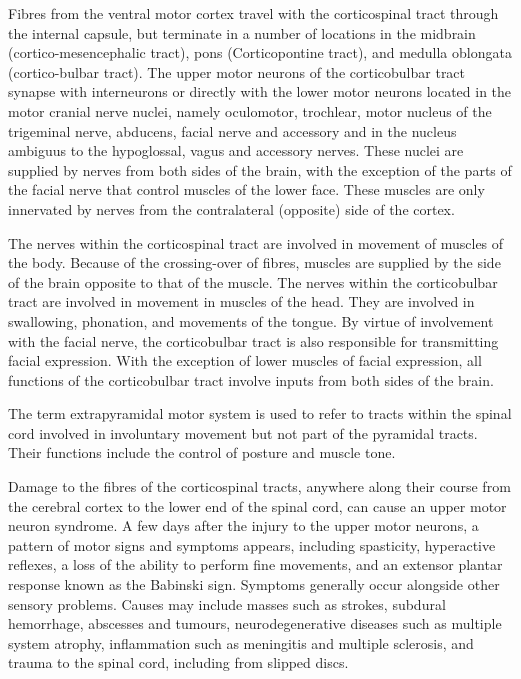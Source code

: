Fibres from the ventral motor cortex travel with the corticospinal tract through the internal capsule, but terminate in a number of locations in the midbrain (cortico-mesencephalic tract), pons (Corticopontine tract), and medulla oblongata (cortico-bulbar tract). The upper motor neurons of the corticobulbar tract synapse with interneurons or directly with the lower motor neurons located in the motor cranial nerve nuclei, namely oculomotor, trochlear, motor nucleus of the trigeminal nerve, abducens, facial nerve and accessory and in the nucleus ambiguus to the hypoglossal, vagus and accessory nerves. These nuclei are supplied by nerves from both sides of the brain, with the exception of the parts of the facial nerve that control muscles of the lower face. These muscles are only innervated by nerves from the contralateral (opposite) side of the cortex.

The nerves within the corticospinal tract are involved in movement of muscles of the body. Because of the crossing-over of fibres, muscles are supplied by the side of the brain opposite to that of the muscle. The nerves within the corticobulbar tract are involved in movement in muscles of the head. They are involved in swallowing, phonation, and movements of the tongue. By virtue of involvement with the facial nerve, the corticobulbar tract is also responsible for transmitting facial expression. With the exception of lower muscles of facial expression, all functions of the corticobulbar tract involve inputs from both sides of the brain.

The term extrapyramidal motor system is used to refer to tracts within the spinal cord involved in involuntary movement but not part of the pyramidal tracts. Their functions include the control of posture and muscle tone.

Damage to the fibres of the corticospinal tracts, anywhere along their course from the cerebral cortex to the lower end of the spinal cord, can cause an upper motor neuron syndrome. A few days after the injury to the upper motor neurons, a pattern of motor signs and symptoms appears, including spasticity, hyperactive reflexes, a loss of the ability to perform fine movements, and an extensor plantar response known as the Babinski sign. Symptoms generally occur alongside other sensory problems. Causes may include masses such as strokes, subdural hemorrhage, abscesses and tumours, neurodegenerative diseases such as multiple system atrophy, inflammation such as meningitis and multiple sclerosis, and trauma to the spinal cord, including from slipped discs.

